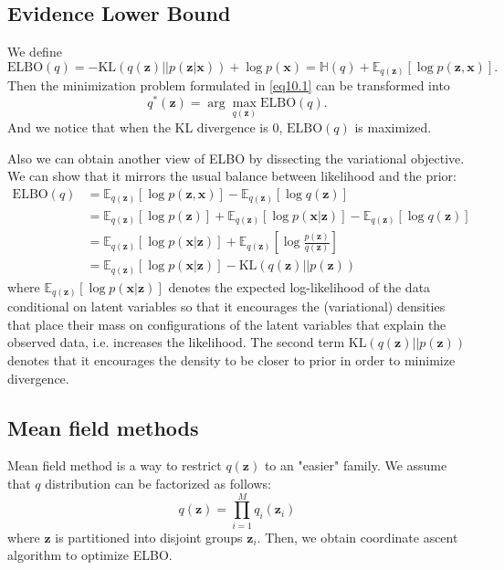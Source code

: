\documentclass{article}
\newcommand{\mrm}{\mathrm}
\newcommand{\mbf}{\mathbf}
\newcommand{\xx}{\mbf x}
\newcommand{\zz}{\mbf z}
\newcommand{\Exp}{\mathbb{E}}
\begin{document}
\subsection{Evidence Lower Bound}
We define 
\begin{equation}
    \mrm{ELBO}(q) = -\mrm{KL}(q(\zz)||p(\zz|\xx)) +\log p(\xx) =  \mathbb H(q) + \Exp_{q(\zz)}[\log p(\zz,\xx)].
\end{equation}
Then the minimization problem formulated in \ref{eq10.1} can be transformed into 
\begin{equation}
    q^*(\zz) = \arg\max_{q(\zz)}\mrm{ELBO}(q).
\end{equation}
And we notice that when the KL divergence is 0, $\mrm{ELBO}(q)$ is maximized. 

Also we can obtain another view of ELBO by dissecting the variational objective. We can show that it mirrors the usual balance between likelihood and the prior:
\begin{align}
    \mrm{ELBO} (q) & = \Exp_{q(\zz)}[\log p(\zz,\xx)]-\Exp_{q(\zz)}[\log q(\zz)] \\
     & = \Exp_{q(\zz)}[\log p(\zz)] + \Exp_{q(\zz)}[\log p(\xx|\zz)]-\Exp_{q(\zz)}[\log q(\zz)] \\
     & = \Exp_{q(\zz)}[\log p(\xx|\zz)] + \Exp_{q(\zz)}[\log \frac{p(\zz)}{q(\zz)}] \\
     & = \Exp_{q(\zz)}[\log p(\xx|\zz)] - \mrm{KL}(q(\zz)||p(\zz))
\end{align}
where $\Exp_{q(\zz)}[\log p(\xx|\zz)]$ denotes the expected log-likelihood of the data conditional on latent variables so that it encourages the (variational) densities that place their mass on configurations of the
latent variables that explain the observed data, i.e. increases the likelihood. The second term $ \mrm{KL}(q(\zz)||p(\zz))$ denotes that it encourages the density to be closer to prior in order to minimize divergence. 

\subsection{Mean field methods}
Mean field method is a way to restrict $q(\zz)$ to an "easier" family. We assume that $q$ distribution can be factorized as follows:
\begin{equation}
    q(\zz) = \prod_{i=1}^Mq_i(\zz_i)
\end{equation}
where $\zz$ is partitioned into disjoint groups $\zz_i$.   Then, we obtain coordinate ascent algorithm to optimize ELBO. 
\end{document}
